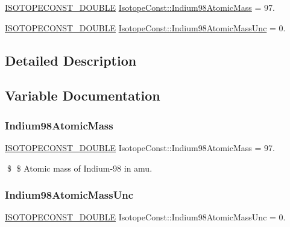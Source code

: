 \begin{DoxyCompactItemize}
\item 
\mbox{\hyperlink{group___isotope_const-_macros_ga8f45a7272ce02c0b4c65c44636ed719a}{I\+S\+O\+T\+O\+P\+E\+C\+O\+N\+S\+T\+\_\+\+D\+O\+U\+B\+LE}} \mbox{\hyperlink{group___isotope_const-_indium-_in98_gacf8e79697b2fd5b773859e33960daa50}{Isotope\+Const\+::\+Indium98\+Atomic\+Mass}} = 97.
\item 
\mbox{\hyperlink{group___isotope_const-_macros_ga8f45a7272ce02c0b4c65c44636ed719a}{I\+S\+O\+T\+O\+P\+E\+C\+O\+N\+S\+T\+\_\+\+D\+O\+U\+B\+LE}} \mbox{\hyperlink{group___isotope_const-_indium-_in98_ga8b5ad72486c873cadb6c73246e8e2acd}{Isotope\+Const\+::\+Indium98\+Atomic\+Mass\+Unc}} = 0.
\end{DoxyCompactItemize}


\subsection{Detailed Description}


\subsection{Variable Documentation}
\mbox{\label{group___isotope_const-_indium-_in98_gacf8e79697b2fd5b773859e33960daa50}} 
\subsubsection{\texorpdfstring{Indium98\+Atomic\+Mass}{Indium98AtomicMass}}
{\footnotesize\ttfamily \mbox{\hyperlink{group___isotope_const-_macros_ga8f45a7272ce02c0b4c65c44636ed719a}{I\+S\+O\+T\+O\+P\+E\+C\+O\+N\+S\+T\+\_\+\+D\+O\+U\+B\+LE}} Isotope\+Const\+::\+Indium98\+Atomic\+Mass = 97.}

\$ \$ Atomic mass of Indium-\/98 in amu. \mbox{\label{group___isotope_const-_indium-_in98_ga8b5ad72486c873cadb6c73246e8e2acd}} 
\subsubsection{\texorpdfstring{Indium98\+Atomic\+Mass\+Unc}{Indium98AtomicMassUnc}}
{\footnotesize\ttfamily \mbox{\hyperlink{group___isotope_const-_macros_ga8f45a7272ce02c0b4c65c44636ed719a}{I\+S\+O\+T\+O\+P\+E\+C\+O\+N\+S\+T\+\_\+\+D\+O\+U\+B\+LE}} Isotope\+Const\+::\+Indium98\+Atomic\+Mass\+Unc = 0.}

